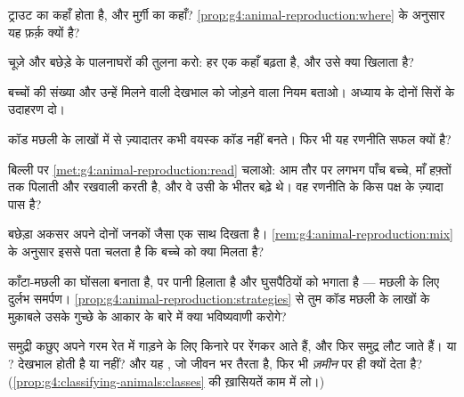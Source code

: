 \begin{exercise}[$\star$]\label{exo:g4:animal-reproduction:4}
ट्राउट का  कहाँ होता है, और मुर्ग़ी का कहाँ?
\cref{prop:g4:animal-reproduction:where} के अनुसार यह फ़र्क़ क्यों है?
\end{exercise}

\begin{exercise}[$\star$]\label{exo:g4:animal-reproduction:5}
चूज़े और बछेड़े के पालनाघरों की तुलना करो: हर एक कहाँ बढ़ता है, और उसे
क्या खिलाता है?
\end{exercise}

\begin{exercise}[$\star$]\label{exo:g4:animal-reproduction:6}
बच्चों की संख्या और उन्हें मिलने वाली देखभाल को जोड़ने वाला नियम बताओ।
अध्याय के दोनों सिरों के उदाहरण दो।
\end{exercise}

\begin{exercise}[$\star$]\label{exo:g4:animal-reproduction:7}
कॉड मछली के लाखों  में से ज़्यादातर कभी वयस्क कॉड नहीं बनते। फिर
भी यह रणनीति सफल क्यों है?
\end{exercise}

\begin{exercise}[$\star$]\label{exo:g4:animal-reproduction:8}
बिल्ली पर \cref{met:g4:animal-reproduction:read} चलाओ: आम तौर पर लगभग
पाँच बच्चे, माँ हफ़्तों तक  पिलाती और रखवाली करती है, और वे उसी के
भीतर बढ़े थे। वह रणनीति के किस पक्ष के ज़्यादा पास है?
\end{exercise}

\begin{exercise}[$\star\star$]\label{exo:g4:animal-reproduction:9}
बछेड़ा अकसर अपने दोनों जनकों जैसा एक साथ दिखता है।
\cref{rem:g4:animal-reproduction:mix} के अनुसार इससे पता चलता है कि
बच्चे को क्या मिलता है?
\end{exercise}

\begin{exercise}[$\star\star$]\label{exo:g4:animal-reproduction:10}
काँटा-मछली का  घोंसला बनाता है,  पर पानी हिलाता है और घुसपैठियों
को भगाता है --- मछली के लिए दुर्लभ समर्पण।
\cref{prop:g4:animal-reproduction:strategies} से तुम कॉड मछली के
लाखों के मुक़ाबले उसके गुच्छे के आकार के बारे में क्या भविष्यवाणी
करोगे?
\end{exercise}

\begin{exercise}[$\star\star\star$]\label{exo:g4:animal-reproduction:11}
समुद्री कछुए अपने  गरम रेत में गाड़ने के लिए किनारे पर रेंगकर आते
हैं, और फिर समुद्र लौट जाते हैं।  या ? देखभाल होती है या
नहीं? और यह , जो जीवन भर तैरता है, फिर भी \emph{ज़मीन} पर ही
 क्यों देता है? (\cref{prop:g4:classifying-animals:classes} की
 ख़ासियतें काम में लो।)
\end{exercise}
